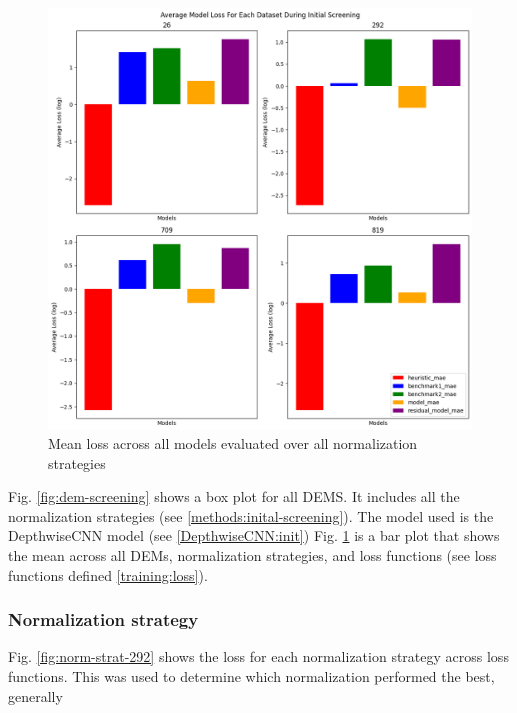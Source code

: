 \begin{figure}[htbp]
	\centering
	\includegraphics[width=0.9\linewidth, height=0.7\linewidth]{"Figures/Results/Initial screening/DEM screening plots/Data_Set_Dem_Screening_Log"}
	\caption[Mean Loss Across DEMs]{Mean loss across all models evaluated over all normalization strategies}
	\label{fig:mean-dem-screening}
\end{figure}

Fig. \ref{fig:dem-screening} shows a box plot for all DEMS. It includes all the normalization strategies (see \ref{methods:inital-screening}). The model used is the DepthwiseCNN model (see \ref{DepthwiseCNN:init}) Fig. \ref{fig:mean-dem-screening} is a bar plot that shows the mean across all DEMs, normalization strategies, and loss functions (see loss functions defined \ref{training:loss}).

\subsubsection*{Normalization strategy}
Fig. \ref{fig:norm-strat-292} shows the loss for each normalization strategy across loss functions. This was used to determine which normalization performed the best, generally

